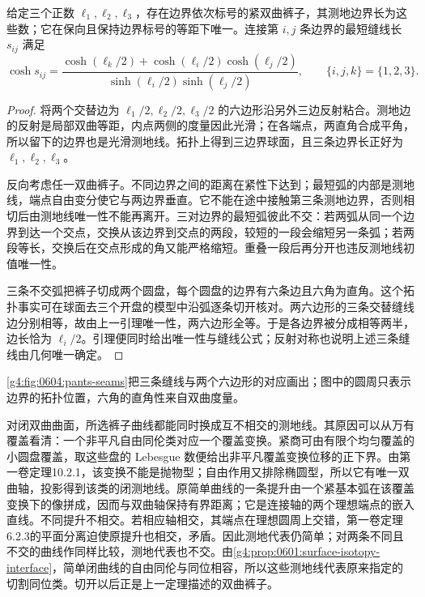 \begin{theorem}
	\label{g4:thm:0604:pants-lengths}
	给定三个正数 \(\ell_1,\ell_2,\ell_3\)，存在边界依次标号的紧双曲裤子，其测地边界长为这些数；它在保向且保持边界标号的等距下唯一。连接第 \(i,j\) 条边界的最短缝线长 \(s_{ij}\) 满足
	\[
		\cosh s_{ij}
		=\frac{\cosh(\ell_k/2)+\cosh(\ell_i/2)\cosh(\ell_j/2)}
		{\sinh(\ell_i/2)\sinh(\ell_j/2)},\qquad \{i,j,k\}=\{1,2,3\}.
	\]
\end{theorem}
\begin{proof}
	将两个交替边为 \(\ell_1/2,\ell_2/2,\ell_3/2\) 的六边形沿另外三边反射粘合。测地边的反射是局部双曲等距，内点两侧的度量因此光滑；在各端点，两直角合成平角，所以留下的边界也是光滑测地线。拓扑上得到三边界球面，且三条边界长正好为 \(\ell_1,\ell_2,\ell_3\)。

	反向考虑任一双曲裤子。不同边界之间的距离在紧性下达到；最短弧的内部是测地线，端点自由变分使它与两边界垂直。它不能在途中接触第三条测地边界，否则相切后由测地线唯一性不能再离开。三对边界的最短弧彼此不交：若两弧从同一个边界到达一个交点，交换从该边界到交点的两段，较短的一段会缩短另一条弧；若两段等长，交换后在交点形成的角又能严格缩短。重叠一段后再分开也违反测地线初值唯一性。

	三条不交弧把裤子切成两个圆盘，每个圆盘的边界有六条边且六角为直角。这个拓扑事实可在球面去三个开盘的模型中沿弧逐条切开核对。两六边形的三条交替缝线边分别相等，故由上一引理唯一性，两六边形全等。于是各边界被分成相等两半，边长恰为 \(\ell_i/2\)。引理便同时给出唯一性与缝线公式；反射对称也说明上述三条缝线由几何唯一确定。
\end{proof}



\cref{g4:fig:0604:pants-seams}把三条缝线与两个六边形的对应画出；图中的圆周只表示边界的拓扑位置，六角的直角性来自双曲度量。

对闭双曲曲面，所选裤子曲线都能同时换成互不相交的测地线。其原因可以从万有覆盖看清：一个非平凡自由同伦类对应一个覆盖变换。紧商可由有限个均匀覆盖的小圆盘覆盖，取这些盘的 Lebesgue 数便给出非平凡覆盖变换位移的正下界。由第一卷定理10.2.1，该变换不能是抛物型；自由作用又排除椭圆型，所以它有唯一双曲轴，投影得到该类的闭测地线。原简单曲线的一条提升由一个紧基本弧在该覆盖变换下的像拼成，因而与双曲轴保持有界距离；它是连接轴的两个理想端点的嵌入直线。不同提升不相交。若相应轴相交，其端点在理想圆周上交错，第一卷定理6.2.3的平面分离迫使原提升也相交，矛盾。因此测地代表仍简单；对两条不同且不交的曲线作同样比较，测地代表也不交。由\cref{g4:prop:0601:surface-isotopy-interface}，简单闭曲线的自由同伦与同位相容，所以这些测地线代表原来指定的切割同位类。切开以后正是上一定理描述的双曲裤子。


